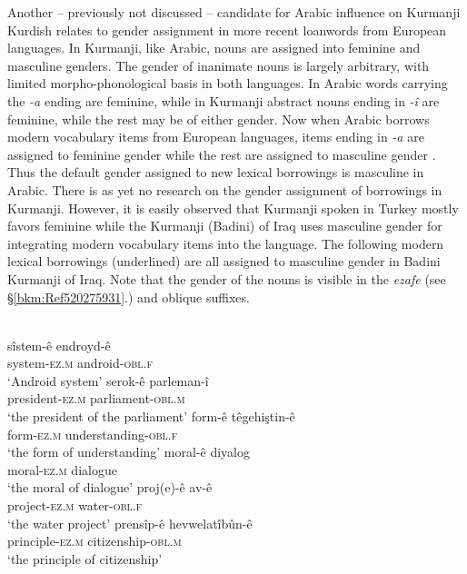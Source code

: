 \documentclass[output=paper]{langsci/langscibook}
\begin{document}
Another – previously not discussed – candidate for Arabic influence on Kurmanji Kurdish relates to gender assignment in more recent loanwords from European languages. In Kurmanji, like Arabic, nouns are assigned into feminine and masculine genders. The gender of inanimate nouns is largely arbitrary, with limited morpho-phonological basis in both languages. In Arabic words carrying the \textit{{}-a} ending are feminine, while in Kurmanji abstract nouns ending in \textit{{}-î} are feminine, while the rest may be of either gender. Now when Arabic borrows modern vocabulary items from European languages, items ending in \textit{{}-a} are assigned to feminine gender while the rest are assigned to masculine gender \citep[5]{Ibrahim2016}. Thus the default gender assigned to new lexical borrowings is masculine in Arabic. There is as yet no research on the gender assignment of borrowings in Kurmanji. However, it is easily observed that Kurmanji spoken in Turkey mostly favors feminine while the Kurmanji (Badini) of Iraq uses masculine gender for integrating modern vocabulary items into the language. The following modern lexical borrowings (underlined) are all assigned to masculine gender in Badini Kurmanji of Iraq. Note that the gender of the nouns is visible in the \textit{ezafe} (see §\ref{bkm:Ref520275931}.) and oblique suffixes. 

\ea{}\\
\ea 
\gll sîstem{}-ê endroyd-ê\\
     system-\textsc{ez.m} android-\textsc{obl.f}\\
\glt ‘Android system’
\ex
\gll serok-ê parleman{}-î\\
     president-\textsc{ez.m} parliament-\textsc{obl.m}\\
\glt ‘the president of the parliament’
\ex \gll form{}-ê têgehiştin-ê\\
     form-\textsc{ez.m} understanding\textsc{{}-obl.f}\\
\glt ‘the form of understanding’
\ex \gll moral-ê diyalog\\
     moral-\textsc{ez.m} dialogue\\
\glt ‘the moral of dialogue’
\ex \gll proj(e)-ê av-ê\\
     project-\textsc{ez.m} water-\textsc{obl.f}\\
\glt ‘the water project’
\ex
\gll prensîp-ê hevwelatîbûn-ê\\
     principle-\textsc{ez.m} citizenship-\textsc{obl.m}\\
\glt ‘the principle of citizenship’
\z
\z
\end{document}
